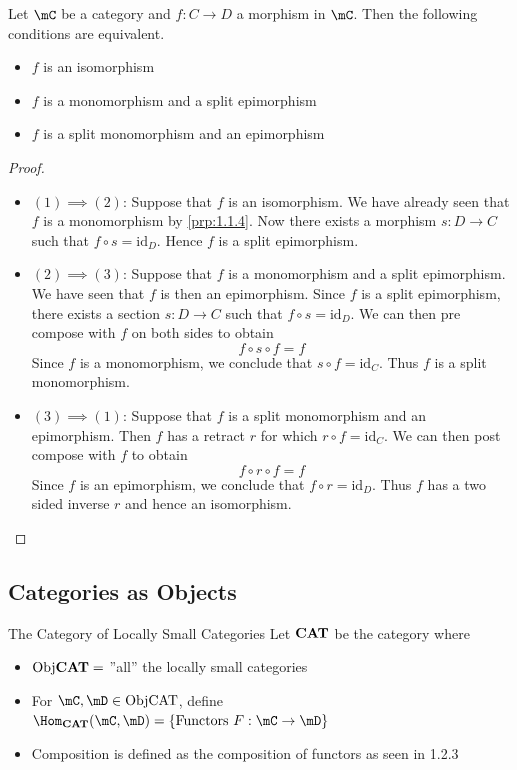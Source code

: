 \documentclass[a4paper]{article}
\begin{document}
\begin{prp}{}{} Let $\mC$ be a category and $f:C\to D$ a morphism in $\mC$. Then the following conditions are equivalent. 
\begin{itemize}
\item $f$ is an isomorphism
\item $f$ is a monomorphism and a split epimorphism
\item $f$ is a split monomorphism and an epimorphism
\end{itemize} 
\begin{proof}~\\
\begin{itemize}
\item $(1)\implies(2)$: Suppose that $f$ is an isomorphism. We have already seen that $f$ is a monomorphism by \ref{prp:1.1.4}. Now there exists a morphism $s:D\to C$ such that $f\circ s=\text{id}_D$. Hence $f$ is a split epimorphism. 

\item $(2)\implies(3)$: Suppose that $f$ is a monomorphism and a split epimorphism. We have seen that $f$ is then an epimorphism. Since $f$ is a split epimorphism, there exists a section $s:D\to C$ such that $f\circ s=\text{id}_D$. We can then pre compose with $f$ on both sides to obtain $$f\circ s\circ f=f$$ Since $f$ is a monomorphism, we conclude that $s\circ f=\text{id}_C$. Thus $f$ is a split monomorphism. 

\item $(3)\implies(1)$: Suppose that $f$ is a split monomorphism and an epimorphism. Then $f$ has a retract $r$ for which $r\circ f=\text{id}_C$. We can then post compose with $f$ to obtain $$f\circ r\circ f=f$$ Since $f$ is an epimorphism, we conclude that $f\circ r=\text{id}_D$. Thus $f$ has a two sided inverse $r$ and hence an isomorphism. 
\end{itemize}
\end{proof}
\end{prp}

\subsection{Categories as Objects}
\begin{defn}{The Category of Locally Small Categories}{} Let $\bold{CAT}$ be the category where 
\begin{itemize}
\item $\text{Obj}\bold{CAT}=$ ''all'' the locally small categories
\item For $\mC,\mD\in\text{Obj}\text{CAT}$, define $\Hom_{\bold{CAT}}(\mC,\mD)=\{\text{Functors }F:\mC\to\mD\}$
\item Composition is defined as the composition of functors as seen in 1.2.3
\end{itemize}
\end{defn}
\end{document}
